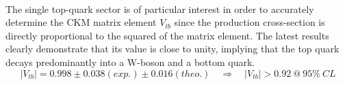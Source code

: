 \\
The single top-quark sector is of particular interest in order to accurately determine the CKM matrix element $V_{tb}$ since the production cross-section is directly proportional to the squared of the matrix element. The latest results~\cite{CMSVtbResult} clearly demonstrate that its value is close to unity, implying that the top quark decays predominantly into a W-boson and a bottom quark. 
\begin{equation}
 \vert V_{tb} \vert = 0.998 \pm 0.038 (exp.) \pm 0.016 (theo.) \quad \Rightarrow \quad \vert V_{tb} \vert > 0.92 ~ @ ~ 95 \% ~ CL
\end{equation}

